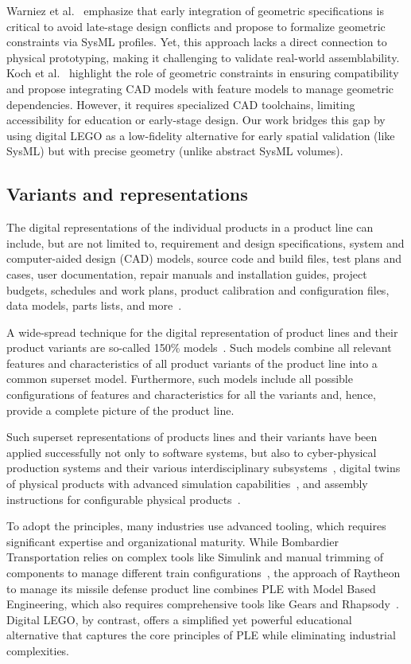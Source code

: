 \documentclass[sigconf,review]{acmart}
\begin{document}
Warniez et al.~\cite{Warniez_2014} emphasize that early integration of geometric specifications is critical to avoid late-stage design conflicts and propose to formalize geometric constraints via SysML profiles. 
Yet, this approach lacks a direct connection to physical prototyping, making it challenging to validate real-world assemblability.
Koch et al.~\cite{Koch_2016} highlight the role of geometric constraints in ensuring compatibility and propose integrating CAD models with feature models to manage geometric dependencies. 
However, it requires specialized CAD toolchains, limiting accessibility for education or early-stage design. 
Our work bridges this gap by using digital LEGO as a low-fidelity alternative for early spatial validation (like SysML) but with precise geometry (unlike abstract SysML volumes).


\subsection{Variants and representations}
\label{sec:variants}

The digital representations of the individual products in a product line can include, but are not limited to, requirement and design specifications, system and computer-aided design (CAD) models, source code and build files, test plans and cases, user documentation, repair manuals and installation guides, project budgets, schedules and work plans, product calibration and configuration files, data models, parts lists, and more~\cite{Clements_2015}. 

A wide-spread technique for the digital representation of product lines and their product variants are so-called 150\% models~\cite{Clements_2015}.
Such models combine all relevant features and characteristics of all product variants of the product line into a common superset model.
Furthermore, such models include all possible configurations of features and characteristics for all the variants and, hence, provide a complete picture of the product line.

Such superset representations of products lines and their variants have been applied successfully not only to software systems, but also to cyber-physical production systems and their various interdisciplinary subsystems~\cite{Fadhlillah_2023}, digital twins of physical products with advanced simulation capabilities~\cite{Wagner_2024}, and assembly instructions for configurable physical products~\cite{Zogopoulos_2024}.

To adopt the principles, many industries use advanced tooling, which requires significant expertise and organizational maturity. 
While Bombardier Transportation relies on complex tools like Simulink and manual trimming of components to manage different train configurations~\cite{Abbas_2020}, the approach of Raytheon to manage its missile defense product line combines PLE with Model Based Engineering, which also requires comprehensive tools like Gears and Rhapsody~\cite{Young_2019}. 
Digital LEGO, by contrast, offers a simplified yet powerful educational alternative that captures the core principles of PLE while eliminating industrial complexities.
\end{document}
